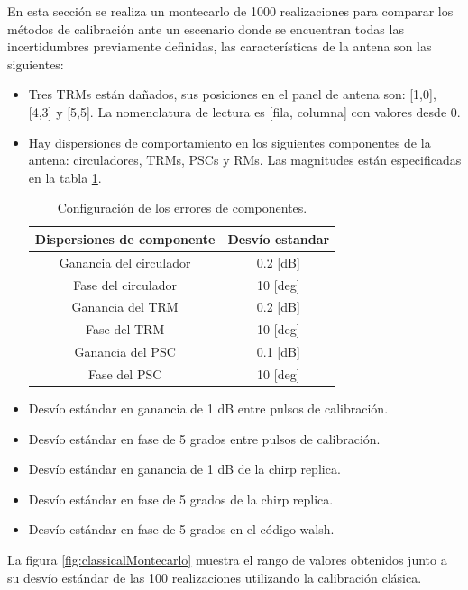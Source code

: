 En esta sección se realiza un montecarlo de 1000 realizaciones para comparar los métodos de calibración ante un escenario donde
se encuentran todas las incertidumbres previamente definidas, las características de la antena son las siguientes:
\begin{itemize}
	\item Tres TRMs están dañados, sus posiciones en el panel de antena son: [1,0], [4,3] y [5,5]. La nomenclatura de lectura es
		[fila, columna] con valores desde 0.
	\item Hay dispersiones de comportamiento en los siguientes componentes de la antena: circuladores, TRMs, PSCs y RMs. Las 
		magnitudes están especificadas en la tabla \ref{tab:errorReferences2}.
		\begin{table}[H]
		  \footnotesize
		  \centering
		  \begin{tabular}{|c|c|}
			\hline
			\textbf{Dispersiones de componente} & \textbf{Desvío estandar} \tabularnewline \hline 
			Ganancia del circulador &  0.2 [dB] \tabularnewline\hline 
			Fase del circulador &  10 [deg] \tabularnewline\hline 
			Ganancia del TRM &  0.2 [dB] \tabularnewline\hline 
			Fase del TRM &  10 [deg] \tabularnewline\hline 
			Ganancia del PSC &  0.1 [dB] \tabularnewline\hline 
			Fase del PSC &  10 [deg] \tabularnewline\hline 
		  \end{tabular}
		  \caption{Configuración de los errores de componentes.}
		  \label{tab:errorReferences2}
		\end{table}
	\item Desvío estándar en ganancia de 1 dB entre pulsos de calibración.
	\item Desvío estándar en fase de 5 grados entre pulsos de calibración.
	\item Desvío estándar en ganancia de 1 dB de la chirp replica.
	\item Desvío estándar en fase de 5 grados de la chirp replica.
	\item Desvío estándar en fase de 5 grados en el código walsh.
\end{itemize}

La figura \ref{fig:classicalMontecarlo} muestra el rango de valores obtenidos junto a su desvío estándar de las 100 
realizaciones utilizando la calibración clásica.

